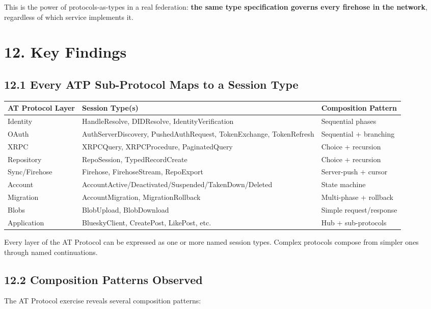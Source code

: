 \documentclass[11pt]{article}
\begin{document}
This is the power of protocols-as-types in a real federation:
\textbf{the same type specification governs every firehose in the network},
regardless of which service implements it.
\section{12. Key Findings}
\label{sec:org27d5237}

\subsection{12.1 Every ATP Sub-Protocol Maps to a Session Type}
\label{sec:org0ab4d3d}

\begin{center}
\begin{tabular}{lll}
AT Protocol Layer & Session Type(s) & Composition Pattern\\
\hline
Identity & HandleResolve, DIDResolve, IdentityVerification & Sequential phases\\
OAuth & AuthServerDiscovery, PushedAuthRequest, TokenExchange, TokenRefresh & Sequential + branching\\
XRPC & XRPCQuery, XRPCProcedure, PaginatedQuery & Choice + recursion\\
Repository & RepoSession, TypedRecordCreate & Choice + recursion\\
Sync/Firehose & Firehose, FirehoseStream, RepoExport & Server-push + cursor\\
Account & AccountActive/Deactivated/Suspended/TakenDown/Deleted & State machine\\
Migration & AccountMigration, MigrationRollback & Multi-phase + rollback\\
Blobs & BlobUpload, BlobDownload & Simple request/response\\
Application & BlueskyClient, CreatePost, LikePost, etc. & Hub + sub-protocols\\
\end{tabular}
\end{center}

Every layer of the AT Protocol can be expressed as one or more named session
types. Complex protocols compose from simpler ones through named continuations.
\subsection{12.2 Composition Patterns Observed}
\label{sec:org8d78132}

The AT Protocol exercise reveals several composition patterns:
\end{document}
